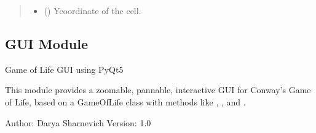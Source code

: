 \documentclass[letterpaper,10pt,oneside,english]{sphinxhowto}
\begin{document}
\begin{fulllineitems}
\begin{fulllineitems}
\begin{quote}
\begin{description}
\begin{itemize}
\item {} 
\sphinxAtStartPar
{} () \textendash{} Y\sphinxhyphen{}coordinate of the cell.

\end{itemize}

\end{description}\end{quote}

\end{fulllineitems}


\end{fulllineitems}


\sphinxstepscope


\subsection{GUI Module}
\label{\detokenize{gui:module-gui.game_gui}}\label{\detokenize{gui:gui-module}}\label{\detokenize{gui::doc}}
\sphinxAtStartPar
Game of Life GUI using PyQt5

\sphinxAtStartPar
This module provides a zoomable, pannable, interactive GUI for Conway’s Game of Life,
based on a GameOfLife class with methods like , , and .

\sphinxAtStartPar
Author: Darya Sharnevich
Version: 1.0
\end{document}
